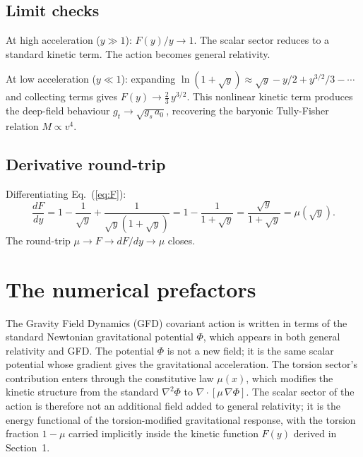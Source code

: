 \documentclass[11pt]{article}
\begin{document}
\subsection*{Limit checks}

At high acceleration ($y \gg 1$): $F(y)/y \to 1$.  The
scalar sector reduces to a standard kinetic term.  The
action becomes general relativity.

At low acceleration ($y \ll 1$): expanding
$\ln(1+\sqrt{y}) \approx \sqrt{y} - y/2 + y^{3/2}/3
- \cdots$ and collecting terms gives
$F(y) \to \tfrac{2}{3}\,y^{3/2}$.  This nonlinear kinetic
term produces the deep-field behaviour
$g_t \to \sqrt{g_s\,a_0}$, recovering the baryonic
Tully-Fisher relation $M \propto v^4$.

\subsection*{Derivative round-trip}

Differentiating Eq.~(\ref{eq:F}):
\begin{equation}
  \frac{dF}{dy} = 1 - \frac{1}{\sqrt{y}}
    + \frac{1}{\sqrt{y}(1+\sqrt{y})}
  = 1 - \frac{1}{1+\sqrt{y}}
  = \frac{\sqrt{y}}{1+\sqrt{y}}
  = \mu(\sqrt{y}).
\end{equation}
The round-trip $\mu \to F \to dF/dy \to \mu$ closes.
\checkmark

\section{The numerical prefactors}

The Gravity Field Dynamics (GFD) covariant action is
written in terms of the standard Newtonian gravitational
potential $\Phi$, which appears in both general relativity
and GFD.  The potential $\Phi$ is not a new field; it is the
same scalar potential whose gradient gives the gravitational
acceleration.  The torsion sector's contribution enters
through the constitutive law $\mu(x)$, which modifies the
kinetic structure from the standard $\nabla^2\Phi$ to
$\nabla\!\cdot[\mu\,\nabla\Phi]$.  The scalar sector of the
action is therefore not an additional field added to general
relativity; it is the energy functional of the
torsion-modified gravitational response, with the torsion
fraction $1 - \mu$ carried implicitly inside the kinetic
function $F(y)$ derived in Section~1.
\end{document}
